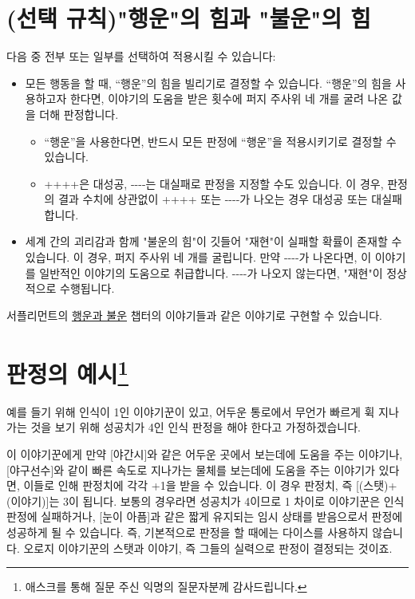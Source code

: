 \documentclass{report}
\begin{document}
	\section*{\hypertarget{pow-of-luck-unluck}{(선택 규칙)"행운"의 힘과 "불운"의 힘}}
	다음 중 전부 또는 일부를 선택하여 적용시킬 수 있습니다:
	\begin{itemize}
		\item 모든 행동을 할 때, “행운”의 힘을 빌리기로 결정할 수 있습니다. “행운”의 힘을 사용하고자 한다면, 이야기의 도움을 받은 횟수에 퍼지 주사위 네 개를 굴려 나온 값을 더해 판정합니다.
		
		\begin{itemize}
			\item “행운”을 사용한다면, 반드시 모든 판정에 “행운”을 적용시키기로 결정할 수 있습니다.
			
			\item ++++은 대성공, -{}-{}-{}-는 대실패로 판정을 지정할 수도 있습니다. 이 경우, 판정의 결과 수치에 상관없이 ++++ 또는 -{}-{}-{}-가 나오는 경우 대성공 또는 대실패합니다.
		\end{itemize}
		
		\item 세계 간의 괴리감과 함께 "불운의 힘"이 깃들어 "재현"이 실패할 확률이 존재할 수 있습니다. 이 경우, 퍼지 주사위 네 개를 굴립니다. 만약 -{}-{}-{}-가 나온다면, 이 이야기를 일반적인 이야기의 도움으로 취급합니다. -{}-{}-{}-가 나오지 않는다면, "재현"이 정상적으로 수행됩니다.
	\end{itemize}
	
	서플리먼트의 \hyperlink{story:luck-unluck}{행운과 불운} 챕터의 이야기들과 같은 이야기로 구현할 수 있습니다.
	
	\section*{판정의 예시\footnote{애스크를 통해 질문 주신 익명의 질문자분께 감사드립니다.}}
	
	예를 들기 위해 인식이 1인 이야기꾼이 있고, 어두운 통로에서 무언가 빠르게 휙 지나가는 것을 보기 위해 성공치가 4인 인식 판정을 해야 한다고 가정하겠습니다.
	
	이 이야기꾼에게 만약 [야간시]와 같은 어두운 곳에서 보는데에 도움을 주는 이야기나, [야구선수]와 같이 빠른 속도로 지나가는 물체를 보는데에 도움을 주는 이야기가 있다면, 이들로 인해 판정치에 각각 +1을 받을 수 있습니다. 이 경우 판정치, 즉 [(스탯)+(이야기)]는 3이 됩니다. 보통의 경우라면 성공치가 4이므로 1 차이로 이야기꾼은 인식 판정에 실패하거나, [눈이 아픔]과 같은 짧게 유지되는 임시 상태를 받음으로서 판정에 성공하게 될 수 있습니다. 즉, 기본적으로 판정을 할 때에는 다이스를 사용하지 않습니다. 오로지 이야기꾼의 스탯과 이야기, 즉 그들의 실력으로 판정이 결정되는 것이죠.
	
\end{document}
